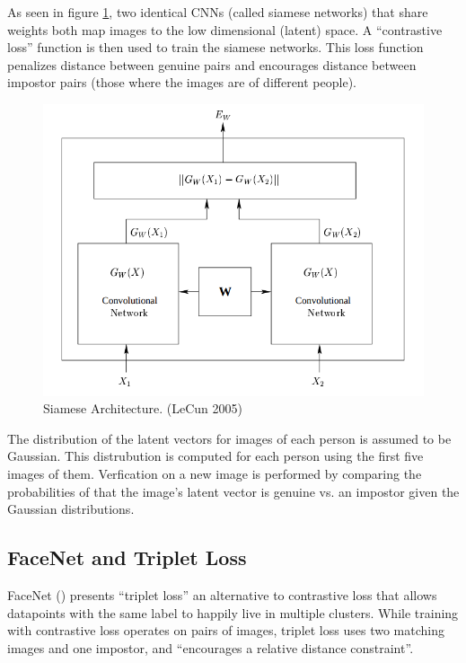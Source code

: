As seen in figure \ref{fig:siamese}, two identical CNNs (called siamese networks) that share weights both map images to the low dimensional (latent) space.
A ``contrastive loss'' function is then used to train the siamese networks.
This loss function penalizes distance between genuine pairs and encourages distance between impostor pairs (those where the images are of different people)\cite{LeCun}.
\begin{figure}[h]
    \begin{center}
        \includegraphics[width=0.8\linewidth]{siamese_architecture.png}
    \end{center}
    \caption{Siamese Architecture. (LeCun 2005)}
    \label{fig:siamese}
\end{figure}

The distribution of the latent vectors for images of each person is assumed to be Gaussian.
This distrubution is computed for each person using the first five images of them.
Verfication on a new image is performed by comparing the probabilities of that the image's latent vector is genuine vs. an impostor given the Gaussian distributions\cite{LeCun}.


\subsection{FaceNet and Triplet Loss} %

FaceNet (\cite{triple_loss}) presents ``triplet loss'' an alternative to contrastive loss that allows datapoints with the same label to happily live in multiple clusters.
While training with contrastive loss operates on pairs of images, triplet loss uses two matching images and one impostor, and ``encourages a relative distance constraint''\cite{face_net}.

